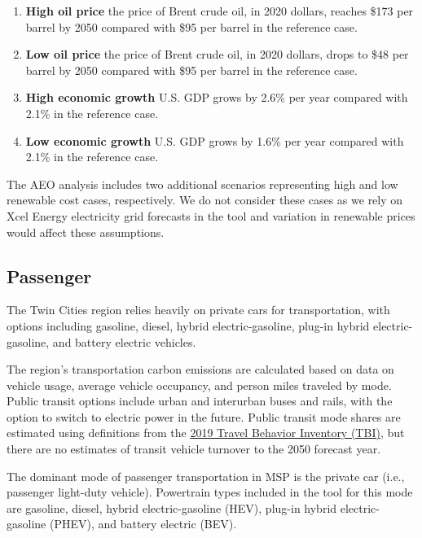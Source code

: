 \documentclass[
]{book}
\providecommand{\tightlist}{%
  \setlength{\itemsep}{0pt}\setlength{\parskip}{0pt}}
\begin{document}
\begin{enumerate}
\def\labelenumi{\arabic{enumi}.}
\tightlist
\item
  \textbf{High oil price} the price of Brent crude oil, in 2020 dollars, reaches \$173 per barrel by 2050 compared with \$95 per barrel in the reference case.\\
\item
  \textbf{Low oil price} the price of Brent crude oil, in 2020 dollars, drops to \$48 per barrel by 2050 compared with \$95 per barrel in the reference case.\\
\item
  \textbf{High economic growth} U.S. GDP grows by 2.6\% per year compared with 2.1\% in the reference case.\\
\item
  \textbf{Low economic growth} U.S. GDP grows by 1.6\% per year compared with 2.1\% in the reference case.
\end{enumerate}

The AEO analysis includes two additional scenarios representing high and low renewable cost cases, respectively. We do not consider these cases as we rely on Xcel Energy electricity grid forecasts in the tool and variation in renewable prices would affect these assumptions.

\hypertarget{passenger}{%
\subsection{Passenger}\label{passenger}}

The Twin Cities region relies heavily on private cars for transportation, with options including gasoline, diesel, hybrid electric-gasoline, plug-in hybrid electric-gasoline, and battery electric vehicles.

The region's transportation carbon emissions are calculated based on data on vehicle usage, average vehicle occupancy, and person miles traveled by mode. Public transit options include urban and interurban buses and rails, with the option to switch to electric power in the future. Public transit mode shares are estimated using definitions from the \href{https://metrocouncil.org/Transportation/Performance/Travel-Behavior-Inventory.aspx}{2019 Travel Behavior Inventory (TBI)}, but there are no estimates of transit vehicle turnover to the 2050 forecast year.

The dominant mode of passenger transportation in MSP is the private car (i.e., passenger light-duty vehicle). Powertrain types included in the tool for this mode are gasoline, diesel, hybrid electric-gasoline (HEV), plug-in hybrid electric-gasoline (PHEV), and battery electric (BEV).
\end{document}
